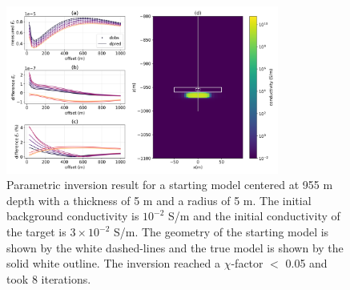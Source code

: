 \begin{figure}
    \begin{center}
    \includegraphics[width=0.8\textwidth]{figures/inversion/parametric_voxel2.png}
    \end{center}
\caption{
    Parametric inversion result for a starting model
    centered at 955 m depth with a thickness of 5 m and a radius of 5 m. The initial background
    conductivity is $10^{-2}$ S/m and the initial conductivity of the target is $3\times10^{-2}$ S/m.
    The geometry of the starting model is shown by the white dashed-lines and the
    true model is shown by the solid white outline. The inversion reached a $\chi$-factor $<$ 0.05
    and took 8 iterations.
}
\label{fig:parametric_voxel2}
\end{figure}
